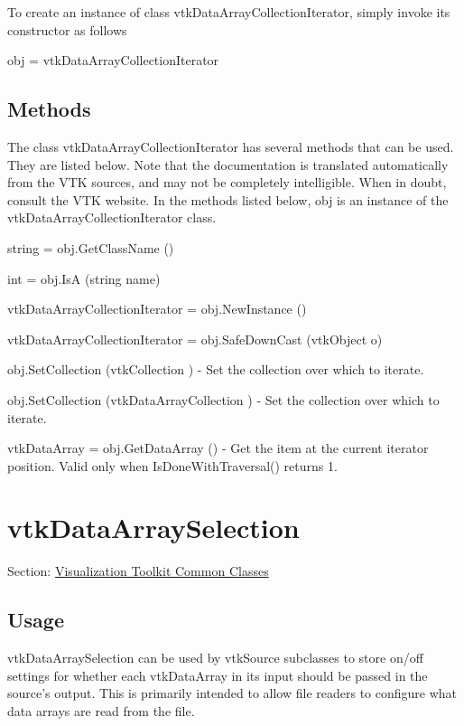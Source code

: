 To create an instance of class vtk\-Data\-Array\-Collection\-Iterator, simply invoke its constructor as follows \begin{DoxyVerb}  obj = vtkDataArrayCollectionIterator
\end{DoxyVerb}
 \hypertarget{vtkwidgets_vtkxyplotwidget_Methods}{}\subsection{Methods}\label{vtkwidgets_vtkxyplotwidget_Methods}
The class vtk\-Data\-Array\-Collection\-Iterator has several methods that can be used. They are listed below. Note that the documentation is translated automatically from the V\-T\-K sources, and may not be completely intelligible. When in doubt, consult the V\-T\-K website. In the methods listed below, {\ttfamily obj} is an instance of the vtk\-Data\-Array\-Collection\-Iterator class. 
\begin{DoxyItemize}
\item {\ttfamily string = obj.\-Get\-Class\-Name ()}  
\item {\ttfamily int = obj.\-Is\-A (string name)}  
\item {\ttfamily vtk\-Data\-Array\-Collection\-Iterator = obj.\-New\-Instance ()}  
\item {\ttfamily vtk\-Data\-Array\-Collection\-Iterator = obj.\-Safe\-Down\-Cast (vtk\-Object o)}  
\item {\ttfamily obj.\-Set\-Collection (vtk\-Collection )} -\/ Set the collection over which to iterate.  
\item {\ttfamily obj.\-Set\-Collection (vtk\-Data\-Array\-Collection )} -\/ Set the collection over which to iterate.  
\item {\ttfamily vtk\-Data\-Array = obj.\-Get\-Data\-Array ()} -\/ Get the item at the current iterator position. Valid only when Is\-Done\-With\-Traversal() returns 1.  
\end{DoxyItemize}\hypertarget{vtkcommon_vtkdataarrayselection}{}\section{vtk\-Data\-Array\-Selection}\label{vtkcommon_vtkdataarrayselection}
Section\-: \hyperlink{sec_vtkcommon}{Visualization Toolkit Common Classes} \hypertarget{vtkwidgets_vtkxyplotwidget_Usage}{}\subsection{Usage}\label{vtkwidgets_vtkxyplotwidget_Usage}
vtk\-Data\-Array\-Selection can be used by vtk\-Source subclasses to store on/off settings for whether each vtk\-Data\-Array in its input should be passed in the source's output. This is primarily intended to allow file readers to configure what data arrays are read from the file.

